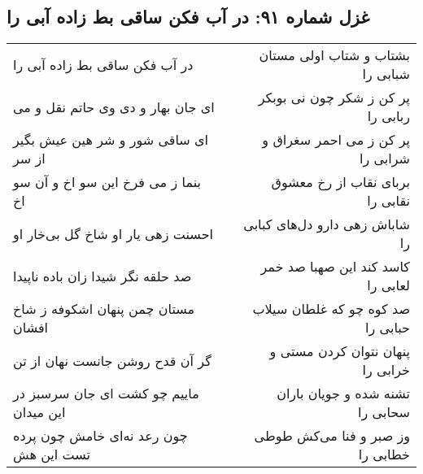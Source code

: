 \begin{center}
\section*{غزل شماره ۹۱: در آب فکن ساقی بط زاده آبی را}
\label{sec:0091}
\begin{longtable}{l p{0.5cm} r}
در آب فکن ساقی بط زاده آبی را
&&
بشتاب و شتاب اولی مستان شبابی را
\\
ای جان بهار و دی وی حاتم نقل و می
&&
پر کن ز شکر چون نی بوبکر ربابی را
\\
ای ساقی شور و شر هین عیش بگیر از سر
&&
پر کن ز می احمر سغراق و شرابی را
\\
بنما ز می فرخ این سو اخ و آن سو اخ
&&
بربای نقاب از رخ معشوق نقابی را
\\
احسنت زهی یار او شاخ گل بی‌خار او
&&
شاباش زهی دارو دل‌های کبابی را
\\
صد حلقه نگر شیدا زان باده ناپیدا
&&
کاسد کند این صهبا صد خمر لعابی را
\\
مستان چمن پنهان اشکوفه ز شاخ افشان
&&
صد کوه چو که غلطان سیلاب حبابی را
\\
گر آن قدح روشن جانست نهان از تن
&&
پنهان نتوان کردن مستی و خرابی را
\\
ماییم چو کشت ای جان سرسبز در این میدان
&&
تشنه شده و جویان باران سحابی را
\\
چون رعد نه‌ای خامش چون پرده تست این هش
&&
وز صبر و فنا می‌کش طوطی خطابی را
\\
\end{longtable}
\end{center}
